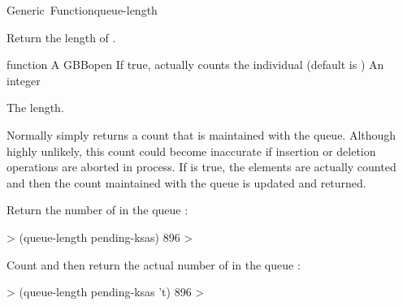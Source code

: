 \documentclass[10pt,twoside,english,pdftex]{article}
\begin{document}
\begin{functiondoc}{Generic~Function}{queue-length}{
      
    \returns{} }
%
%

\fnsyntax

\fnpurpose Return the length of .

\fnmethods
{} 

\fnpackage {}

\fnmodule {}

\fnargs
\begin{args}{function}
\arg[queue] A GBBopen 
\arg[recount-p] If true, actually counts the individual
 (default is \nil) 
\arg[integer] An integer
\end{args}

\fnreturns The  length.

\fndescription Normally  simply returns a count
that is maintained with the queue.  Although highly unlikely, this count could
become inaccurate if  insertion or deletion operations
are aborted in process. If  is true, the elements are
actually counted and then the count maintained with the queue is updated and
returned.

\fnexamples
Return the number of  in the queue :
%
\W\supp
\begin{example}
  > (queue-length pending-ksas)
  896
  >
\end{example}
%
Count and then return the actual number of  in the
queue :
%
\W\supp\notpretop
\begin{example}
  > (queue-length pending-ksas 't)
  896
  >
\end{example}

\end{functiondoc}

\end{document}
